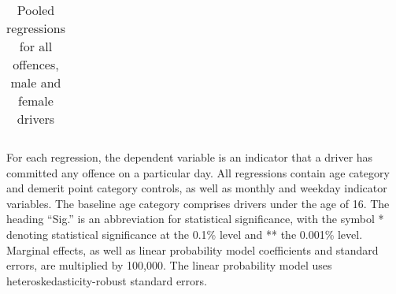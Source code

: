 \begin{table}
\begin{tabular}{l r r r l r r l}
%

\end{tabular} 
\caption{Pooled regressions for all offences, male and female drivers} 
For each regression, the dependent variable is an indicator that a driver has committed  
any offence on a particular day.  
All regressions contain age category and demerit point category controls, 
as well as monthly and weekday indicator variables. 
The baseline age category comprises drivers under the age of 16. 
The heading ``Sig.'' is an abbreviation for statistical significance, with 
the symbol * denoting statistical significance at the 0.1\% level 
and ** the 0.001\% level. 
% 
Marginal effects, as well as linear probability model coefficients and standard errors, are multiplied by 100,000. 
The linear probability model uses heteroskedasticity-robust standard errors. 
% 
\label{tab:seas_Logit_vs_LPMx100K_pooled_regs} 
\end{table} 
 
